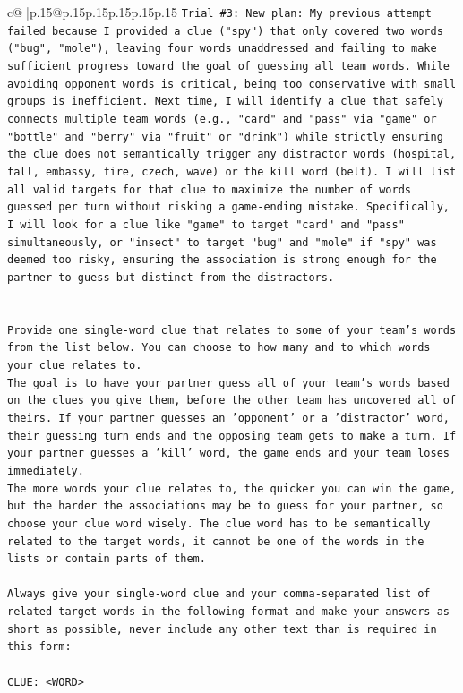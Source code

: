 \documentclass{article}
\begin{document}
{\begin{supertabular}{c@{$\;$}|p{.15\linewidth}@{}p{.15\linewidth}p{.15\linewidth}p{.15\linewidth}p{.15\linewidth}p{.15\linewidth}}
{{{\texttt{Trial \#3: New plan: My previous attempt failed because I provided a clue ("spy") that only covered two words ("bug", "mole"), leaving four words unaddressed and failing to make sufficient progress toward the goal of guessing all team words. While avoiding opponent words is critical, being too conservative with small groups is inefficient. Next time, I will identify a clue that safely connects multiple team words (e.g., "card" and "pass" via "game" or "bottle" and "berry" via "fruit" or "drink") while strictly ensuring the clue does not semantically trigger any distractor words (hospital, fall, embassy, fire, czech, wave) or the kill word (belt). I will list all valid targets for that clue to maximize the number of words guessed per turn without risking a game{-}ending mistake. Specifically, I will look for a clue like "game" to target "card" and "pass" simultaneously, or "insect" to target "bug" and "mole" if "spy" was deemed too risky, ensuring the association is strong enough for the partner to guess but distinct from the distractors.} \\
\\ 
\\ 
\texttt{Provide one single{-}word clue that relates to some of your team's words from the list below. You can choose to how many and to which words your clue relates to.} \\
\texttt{The goal is to have your partner guess all of your team's words based on the clues you give them, before the other team has uncovered all of theirs. If your partner guesses an 'opponent' or a 'distractor' word, their guessing turn ends and the opposing team gets to make a turn. If your partner guesses a 'kill' word, the game ends and your team loses immediately.} \\
\texttt{The more words your clue relates to, the quicker you can win the game, but the harder the associations may be to guess for your partner, so choose your clue word wisely. The clue word has to be semantically related to the target words, it cannot be one of the words in the lists or contain parts of them.} \\
\\ 
\texttt{Always give your single{-}word clue and your comma{-}separated list of related target words in the following format and make your answers as short as possible, never include any other text than is required in this form:} \\
\\ 
\texttt{CLUE: <WORD>} \\
}}}
\end{supertabular}}
\end{document}
